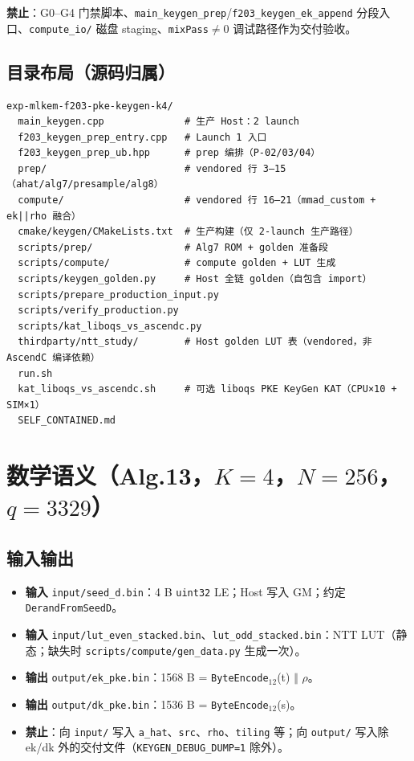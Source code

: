 \documentclass[UTF8,a4paper,11pt]{ctexart}
\begin{document}
\textbf{禁止}：G0--G4 门禁脚本、\texttt{main\_keygen\_prep}/\texttt{f203\_keygen\_ek\_append} 分段入口、\texttt{compute\_io/} 磁盘 staging、\texttt{mixPass}$\neq$0 调试路径作为交付验收。

\subsection{目录布局（源码归属）}

\begin{verbatim}
exp-mlkem-f203-pke-keygen-k4/
  main_keygen.cpp              # 生产 Host：2 launch
  f203_keygen_prep_entry.cpp   # Launch 1 入口
  f203_keygen_prep_ub.hpp      # prep 编排（P-02/03/04）
  prep/                        # vendored 行 3–15（ahat/alg7/presample/alg8）
  compute/                     # vendored 行 16–21（mmad_custom + ek||rho 融合）
  cmake/keygen/CMakeLists.txt  # 生产构建（仅 2-launch 生产路径）
  scripts/prep/                # Alg7 ROM + golden 准备段
  scripts/compute/             # compute golden + LUT 生成
  scripts/keygen_golden.py     # Host 全链 golden（自包含 import）
  scripts/prepare_production_input.py
  scripts/verify_production.py
  scripts/kat_liboqs_vs_ascendc.py
  thirdparty/ntt_study/        # Host golden LUT 表（vendored，非 AscendC 编译依赖）
  run.sh
  kat_liboqs_vs_ascendc.sh     # 可选 liboqs PKE KeyGen KAT（CPU×10 + SIM×1）
  SELF_CONTAINED.md
\end{verbatim}

\section{数学语义（Alg.13，$K=4$，$N=256$，$q=3329$）}

\subsection{输入输出}

\begin{itemize}
  \item \textbf{输入} \texttt{input/seed\_d.bin}：4 B \texttt{uint32} LE；Host 写入 GM；约定 \texttt{DerandFromSeedD}。
  \item \textbf{输入} \texttt{input/lut\_even\_stacked.bin}、\texttt{lut\_odd\_stacked.bin}：NTT LUT（静态；缺失时 \texttt{scripts/compute/gen\_data.py} 生成一次）。
  \item \textbf{输出} \texttt{output/ek\_pke.bin}：1568 B = \texttt{ByteEncode$_{12}$}(t) $\Vert$ $\rho$。
  \item \textbf{输出} \texttt{output/dk\_pke.bin}：1536 B = \texttt{ByteEncode$_{12}$}(s)。
  \item \textbf{禁止}：向 \texttt{input/} 写入 \texttt{a\_hat}、\texttt{src}、\texttt{rho}、\texttt{tiling} 等；向 \texttt{output/} 写入除 ek/dk 外的交付文件（\texttt{KEYGEN\_DEBUG\_DUMP=1} 除外）。
\end{itemize}
\end{document}
